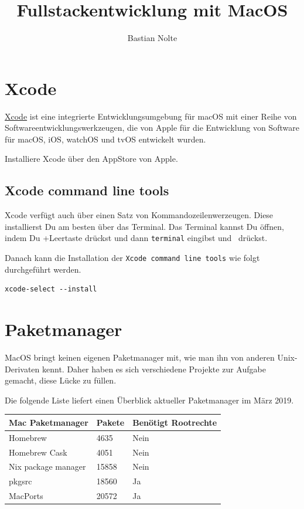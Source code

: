 \documentclass[]{article}
\title{Fullstackentwicklung mit MacOS}
\author{Bastian Nolte}
\newcommand{\code}[1]{\texttt{#1}}
\begin{document}
\maketitle

\section{Xcode}
\href{https://developer.apple.com/xcode/}{Xcode} ist eine integrierte Entwicklungsumgebung für macOS mit einer Reihe von Softwareentwicklungswerkzeugen, die von Apple für die Entwicklung von Software für macOS, iOS, watchOS und tvOS entwickelt wurden.

Installiere Xcode über den AppStore von Apple.
\subsection{Xcode command line tools}
Xcode verfügt auch über einen Satz von Kommandozeilenwerzeugen. Diese installierst Du am besten über das Terminal. Das Terminal kannst Du öffnen, indem Du \cmdkey+Leertaste drückst und dann \code{terminal} eingibst und \returnkey\, drückst.

Danach kann die Installation der \code{Xcode  command line tools} wie folgt durchgeführt werden.
\begin{verbatim}
xcode-select --install
\end{verbatim}

\section{Paketmanager}
MacOS bringt keinen eigenen Paketmanager mit, wie man ihn von anderen Unix-Derivaten kennt. Daher haben es sich verschiedene Projekte zur Aufgabe gemacht, diese Lücke zu füllen.

Die folgende Liste liefert einen Überblick aktueller Paketmanager im März 2019.

\begin{tabular}[t]{lll}
	\toprule
	Mac Paketmanager & Pakete & Benötigt Rootrechte \\
	\midrule
	Homebrew & 4635 & Nein \\
	Homebrew Cask & 4051 & Nein \\
	Nix package manager & 15858 & Nein \\
	pkgsrc & 18560 & Ja \\
	MacPorts & 20572 & Ja \\
	\bottomrule
\end{tabular}
\end{document}
